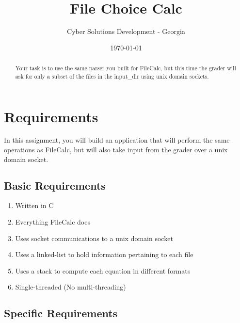 \documentclass[letterpaper,12pt]{article}
\begin{document}
	
	\title{File Choice Calc}
	\author{Cyber Solutions Development - Georgia}
	\date{\today}
	\maketitle
	
	\begin{abstract}
		Your task is to use the same parser you built for FileCalc, but this time the grader will ask for only a subset of the files in the input\_dir using unix domain sockets.
	\end{abstract}
	
	
	\section{Requirements}
	
	In this assignment, you will build an application that will perform the same operations as FileCalc, but will also take input from the grader over a unix domain socket.
	
	\subsection{Basic Requirements}
		\begin{enumerate}
			\item Written in C
			\item Everything FileCalc does
			\item Uses socket communications to a unix domain socket
			\item Uses a linked-list to hold information pertaining to each file
			\item Uses a stack to compute each equation in different formats
			\item Single-threaded (No multi-threading)
	\end{enumerate}
	
	\subsection{Specific Requirements}
	
\end{document}
